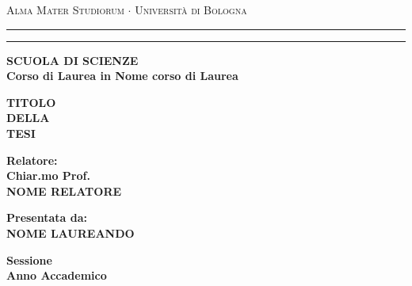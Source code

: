 \documentclass[12pt,a4paper]{report}
\begin{document}
    \begin{titlepage}
        \begin{center}
        {{\Large{\textsc{Alma Mater Studiorum $\cdot$ Universit\`a di
        Bologna}}}}
            \rule[0.1cm]{15.8cm}{0.1mm}
            \rule[0.5cm]{15.8cm}{0.6mm}
            {\small{\bf SCUOLA DI SCIENZE\\
            Corso di Laurea in Nome corso di Laurea }}
        \end{center}
        \vspace{15mm}
        \begin{center}
        {\LARGE{\bf TITOLO}}
            \\
            \vspace{3mm}
            {\LARGE{\bf DELLA}}\\
            \vspace{3mm}
            {\LARGE{\bf TESI}}\\
        \end{center}
        \vspace{40mm}
        \par
        \noindent
        \begin{minipage}[t]{0.47\textwidth}
        {\large{\bf Relatore:\\
        Chiar.mo Prof.\\
        NOME RELATORE}}
        \end{minipage}
        \hfill
        \begin{minipage}[t]{0.47\textwidth}
            \raggedleft
            {\large{\bf Presentata da:\\
            NOME LAUREANDO}}
        \end{minipage}
        \vspace{20mm}
        \begin{center}
        {\large{\bf Sessione\\%
        Anno Accademico }}%
        \end{center}
    \end{titlepage}
\end{document}
